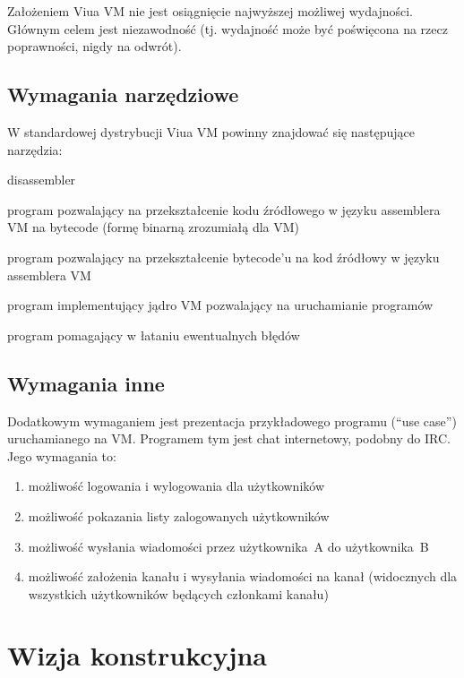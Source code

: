 \documentclass[11pt,oneside,a4paper,titlepage,onecolumn]{article}
\begin{document}
Założeniem Viua VM nie jest osiągnięcie najwyższej możliwej wydajności. Głównym celem jest niezawodność (tj.
wydajność może być poświęcona na rzecz poprawności, nigdy na odwrót).

\subsection{Wymagania narzędziowe}

W standardowej dystrybucji Viua VM powinny znajdować się następujące narzędzia:

\begin{labeling}{disassembler}
\item [\texttt{assembler}] program pozwalający na przekształcenie kodu źródłowego w języku assemblera VM
    na bytecode (formę binarną zrozumiałą dla VM)
\item [\texttt{disassembler}] program pozwalający na przekształcenie bytecode'u na kod źródłowy w języku assemblera VM
\item [\texttt{kernel}] program implementujący jądro VM pozwalający na uruchamianie programów
\item [\texttt{debugger}] program pomagający w łataniu ewentualnych błędów
\end{labeling}

\subsection{Wymagania inne}

Dodatkowym wymaganiem jest prezentacja przykładowego programu (``use case'') uruchamianego na VM.
Programem tym jest chat internetowy, podobny do IRC. Jego wymagania to:

\begin{enumerate}
    \item możliwość logowania i wylogowania dla użytkowników
    \item możliwość pokazania listy zalogowanych użytkowników
    \item możliwość wysłania wiadomości przez użytkownika~A do użytkownika~B
    \item możliwość założenia kanału i wysyłania wiadomości na kanał (widocznych dla wszystkich użytkowników
        będących członkami kanału)
\end{enumerate}

\section{Wizja konstrukcyjna}
\end{document}
